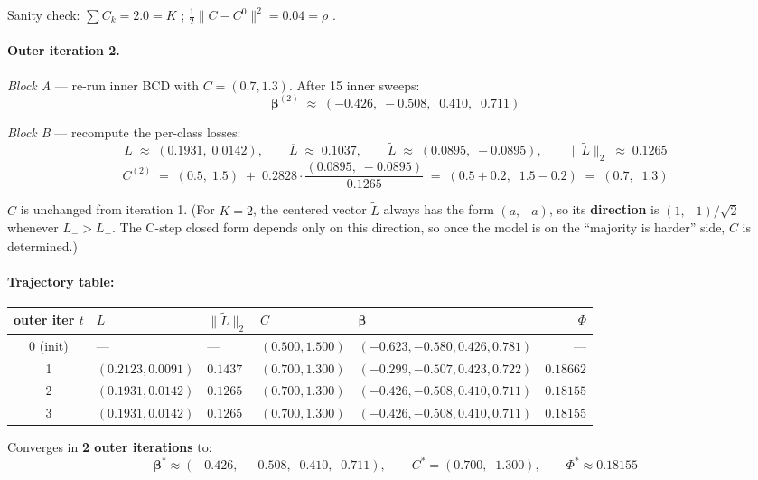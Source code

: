 \documentclass[11pt,a4paper]{article}
\begin{document}
Sanity check: $\sum C_k = 2.0 = K$ \checkmark; $\frac{1}{2}\|C - C^0\|^2 = 0.04 = \rho$ \checkmark.

\paragraph{Outer iteration 2.}

\emph{Block A} --- re-run inner BCD with $C = (0.7, 1.3)$. After 15 inner sweeps:
\[
\boldsymbol{\beta}^{(2)} \;\approx\; (-0.426,\;-0.508,\;\;0.410,\;\;0.711)
\]

\emph{Block B} --- recompute the per-class losses:
\[
L \;\approx\; (0.1931,\;0.0142),\qquad \overline{L} \;\approx\; 0.1037,\qquad \widetilde{L} \;\approx\; (0.0895,\;-0.0895),\qquad \|\widetilde{L}\|_{2} \;\approx\; 0.1265
\]
\[
C^{(2)} \;=\; (0.5,\;1.5) \;+\; 0.2828 \cdot \frac{(0.0895,\;-0.0895)}{0.1265} \;=\; (0.5 + 0.2,\;\;1.5 - 0.2) \;=\; (0.7,\;\;1.3)
\]

$C$ is unchanged from iteration 1. (For $K = 2$, the centered vector $\widetilde{L}$ always has the form $(a, -a)$, so its \textbf{direction} is $(1, -1)/\sqrt{2}$ whenever $L_- > L_+$. The C-step closed form depends only on this direction, so once the model is on the ``majority is harder'' side, $C$ is determined.)

\paragraph{Trajectory table:}

\begin{center}
\small
\begin{tabular}{cllll r}
\toprule
outer iter $t$ & $L$ & $\|\widetilde{L}\|_2$ & $C$ & $\boldsymbol{\beta}$ & $\Phi$ \\
\midrule
0 (init) & --- & --- & $(0.500, 1.500)$ & $(-0.623, -0.580, 0.426, 0.781)$ & --- \\
1 & $(0.2123, 0.0091)$ & $0.1437$ & $(0.700, 1.300)$ & $(-0.299, -0.507, 0.423, 0.722)$ & $0.18662$ \\
2 & $(0.1931, 0.0142)$ & $0.1265$ & $(0.700, 1.300)$ & $(-0.426, -0.508, 0.410, 0.711)$ & $0.18155$ \\
3 & $(0.1931, 0.0142)$ & $0.1265$ & $(0.700, 1.300)$ & $(-0.426, -0.508, 0.410, 0.711)$ & $0.18155$ \\
\bottomrule
\end{tabular}
\end{center}

Converges in \textbf{2 outer iterations} to:
\[
\boldsymbol{\beta}^{*} \approx (-0.426,\;-0.508,\;\;0.410,\;\;0.711),\qquad C^{*} = (0.700,\;\;1.300),\qquad \Phi^{*} \approx 0.18155
\]
\end{document}
